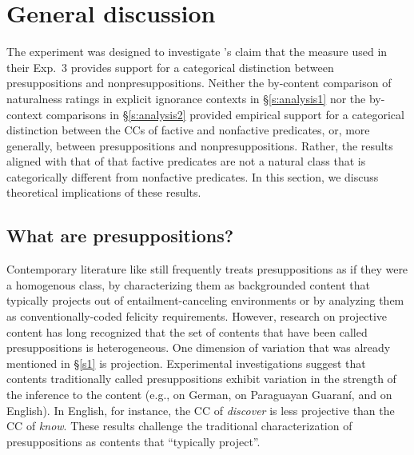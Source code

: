\documentclass[11pt,fleqn]{article}
\newcommand{\6}{\mbox{$[\hspace*{-.6mm}[$}}
\newcommand{\9}{\mbox{$]\hspace*{-.6mm}]$}}
\newcommand{\citepos}[1]{\citeauthor{#1}'s \citeyear{#1}}
\begin{document}

  
\section{General discussion}\label{s3}

The experiment was designed to investigate \citepos{mandelkern-etal2020} claim that the measure used in their Exp.~3 provides support for a categorical distinction between presuppositions and nonpresuppositions. Neither the by-content comparison of naturalness ratings in explicit ignorance contexts  in \S\ref{s:analysis1} nor the by-context comparisons in \S\ref{s:analysis2} provided empirical support for a categorical distinction between the CCs of factive and nonfactive predicates, or, more generally, between presuppositions and nonpresuppositions. Rather, the results aligned with that of \citealt{degen-tonhauser-language} that factive predicates are not a natural class that is categorically different from nonfactive predicates. In this section, we discuss theoretical implications of these results.

\subsection{What are presuppositions?}

Contemporary literature like \citealt{mandelkern-etal2020} still frequently treats presuppositions as if they were a homogenous class, by characterizing them as backgrounded content that typically projects out of entailment-canceling environments or by analyzing them as conventionally-coded felicity requirements. However, research on projective content has long recognized that the set of contents that have been called presuppositions is heterogeneous. One dimension of variation that was already mentioned in \S\ref{s1} is projection. Experimental investigations suggest that contents traditionally called presuppositions exhibit variation in the strength of the inference to the content (e.g., \citealt{xue-onea11} on German, \citealt{tonhauser-guarani-variability} on Paraguayan Guaran\'i, and \citealt{demarneffe-etal-sub23,tbd-variability,degen-tonhauser-language} on English). In English, for instance, the CC of {\em discover} is less projective than the CC of {\em know}. These results challenge the traditional characterization of presuppositions as contents that ``typically project''.
\end{document}
